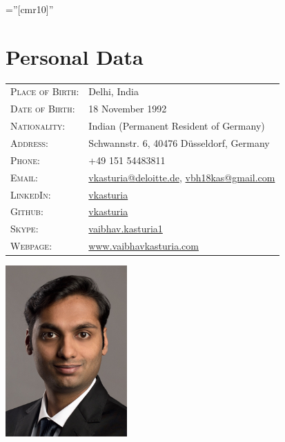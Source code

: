 \documentclass[a4paper,10pt]{article} %
\begin{document}
\pagestyle{empty} %
\font\fb=''[cmr10]'' %


\par{\bigskip\par} %

\section{Personal Data}

\begin{minipage}[b][4.5cm][t]{0.5\textwidth}
\begin{tabular}{ll}
\textsc{Place of Birth:} & Delhi, India \\ 
\textsc{Date of Birth:} & 18 November 1992 \\
\textsc{Nationality:} & Indian (Permanent Resident of Germany)\\
\textsc{Address:} & Schwannstr. 6, 40476 Düsseldorf, Germany \\
\textsc{Phone:} &  +49 151 54483811\\
\textsc{Email:} & \href{mailto:vkasturia@deloitte.de}{vkasturia@deloitte.de}, \href{mailto:vbh18kas@gmail.com}{vbh18kas@gmail.com} \\
\textsc{LinkedIn:} & \href{https://www.linkedin.com/in/vkasturia/}{vkasturia} \\
\textsc{Github:} & \href{https://github.com/vkasturia}{vkasturia} \\
\textsc{Skype:} & \href{https://join.skype.com/invite/apwT2EQ6iqFR}{vaibhav.kasturia1} \\
\textsc{Webpage:} & \href{https://www.vaibhavkasturia.com}{www.vaibhavkasturia.com}
\end{tabular}
\end{minipage}
\begin{minipage}[b][4.5cm][t]{0.5\textwidth}
\hspace{3.5cm}
\includegraphics[width=0.35\textwidth]{./bewerbungsbild_cropped.jpg}
\end{minipage}
\end{document}
